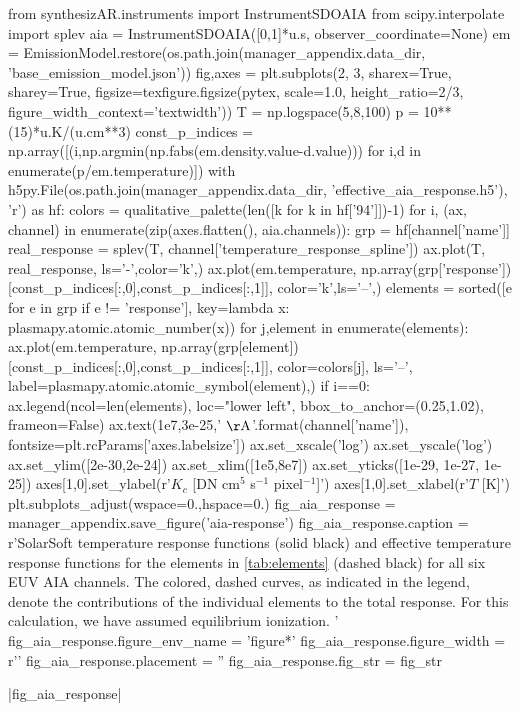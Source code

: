 \begin{pycode}
from synthesizAR.instruments import InstrumentSDOAIA
from scipy.interpolate import splev
aia = InstrumentSDOAIA([0,1]*u.s, observer_coordinate=None)
em = EmissionModel.restore(os.path.join(manager_appendix.data_dir, 'base_emission_model.json'))
fig,axes = plt.subplots(2, 3, sharex=True, sharey=True,
                        figsize=texfigure.figsize(pytex, scale=1.0, height_ratio=2/3,       
                                                  figure_width_context='textwidth'))
T = np.logspace(5,8,100)
p = 10**(15)*u.K/(u.cm**3)
const_p_indices = np.array([(i,np.argmin(np.fabs(em.density.value-d.value))) 
                            for i,d in enumerate(p/em.temperature)])
with h5py.File(os.path.join(manager_appendix.data_dir, 'effective_aia_response.h5'), 'r') as hf:
    colors = qualitative_palette(len([k for k in hf['94']])-1)
    for i, (ax, channel) in enumerate(zip(axes.flatten(), aia.channels)):
        grp = hf[channel['name']]
        real_response = splev(T, channel['temperature_response_spline'])
        ax.plot(T, real_response, ls='-',color='k',)
        ax.plot(em.temperature, 
                np.array(grp['response'])[const_p_indices[:,0],const_p_indices[:,1]],
                color='k',ls='--',)
        elements = sorted([e for e in grp if e != 'response'],
                            key=lambda x: plasmapy.atomic.atomic_number(x))
        for j,element in enumerate(elements):
            ax.plot(em.temperature, 
                    np.array(grp[element])[const_p_indices[:,0],const_p_indices[:,1]],
                    color=colors[j], ls='--', label=plasmapy.atomic.atomic_symbol(element),)
        if i==0:
            ax.legend(ncol=len(elements), loc="lower left", bbox_to_anchor=(0.25,1.02),
                        frameon=False)
        ax.text(1e7,3e-25,'{} $\mathrm{{\AA}}$'.format(channel['name']),
                fontsize=plt.rcParams['axes.labelsize'])
ax.set_xscale('log')
ax.set_yscale('log')
ax.set_ylim([2e-30,2e-24])
ax.set_xlim([1e5,8e7])
ax.set_yticks([1e-29, 1e-27, 1e-25])
axes[1,0].set_ylabel(r'$K_c$ [DN cm$^5$ s$^{-1}$ pixel$^{-1}$]')
axes[1,0].set_xlabel(r'$T$ [K]')
plt.subplots_adjust(wspace=0.,hspace=0.)
fig_aia_response = manager_appendix.save_figure('aia-response')
fig_aia_response.caption = r'SolarSoft temperature response functions (solid black) and effective temperature response functions for the elements in \autoref{tab:elements} (dashed black) for all six EUV AIA channels. The colored, dashed curves, as indicated in the legend, denote the contributions of the individual elements to the total response. For this calculation, we have assumed equilibrium ionization. '
fig_aia_response.figure_env_name = 'figure*'
fig_aia_response.figure_width = r'\textwidth'
fig_aia_response.placement = ''
fig_aia_response.fig_str = fig_str
\end{pycode}
|fig_aia_response|

